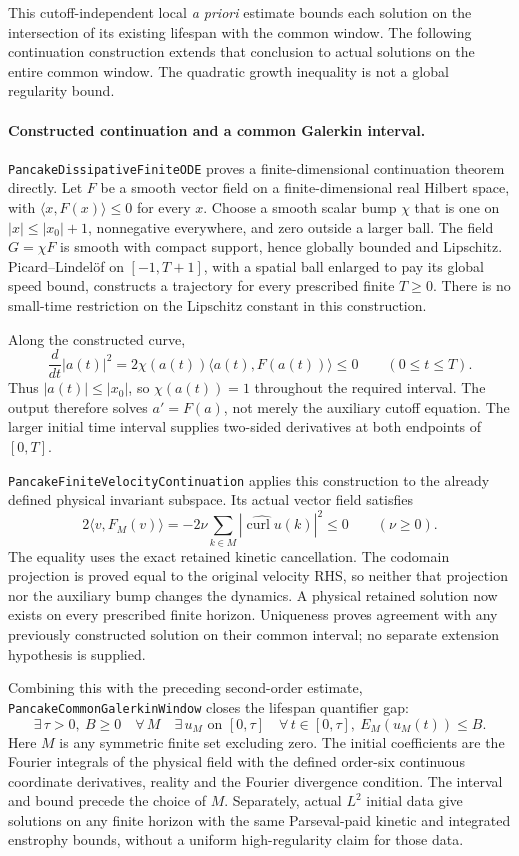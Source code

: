 \documentclass[11pt]{article}
\theoremstyle{definition}
\begin{document}
This cutoff-independent local \emph{a priori} estimate bounds each
solution on the intersection of its existing lifespan with the common
window. The following continuation construction extends that conclusion
to actual solutions on the entire common window. The quadratic growth
inequality is not a global regularity bound.

\paragraph{Constructed continuation and a common Galerkin interval.}
\texttt{PancakeDissipativeFiniteODE} proves a finite-dimensional
continuation theorem directly. Let $F$ be a smooth vector field on a
finite-dimensional real Hilbert space, with
$\langle x,F(x)\rangle\le0$ for every $x$.
Choose a smooth scalar bump $\chi$ that is one on
$|x|\le|x_0|+1$, nonnegative everywhere, and zero outside a larger ball.
The field $G=\chi F$ is smooth with compact support, hence globally
bounded and Lipschitz. Picard--Lindel\"of on $[-1,T+1]$, with a spatial
ball enlarged to pay its global speed bound, constructs a trajectory
for every prescribed finite $T\ge0$. There is no small-time restriction
on the Lipschitz constant in this construction.

Along the constructed curve,
\[
 \frac{d}{dt}|a(t)|^2
   =2\chi(a(t))\langle a(t),F(a(t))\rangle\le0
       \qquad(0\le t\le T).
\]
Thus $|a(t)|\le|x_0|$, so $\chi(a(t))=1$ throughout the required
interval. The output therefore solves $a'=F(a)$, not merely the
auxiliary cutoff equation. The larger initial time interval supplies
two-sided derivatives at both endpoints of $[0,T]$.

\texttt{PancakeFiniteVelocityContinuation} applies this construction
to the already defined physical invariant subspace. Its actual vector
field satisfies
\[
 2\langle v,F_M(v)\rangle
    =-2\nu\sum_{k\in M}|\widehat{\operatorname{curl}u}(k)|^2\le0
       \qquad(\nu\ge0).
\]
The equality uses the exact retained kinetic cancellation. The
codomain projection is proved equal to the original velocity RHS,
so neither that projection nor the auxiliary bump changes the
dynamics. A physical retained solution now exists on every prescribed
finite horizon. Uniqueness proves agreement with any previously
constructed solution on their common interval; no separate extension
hypothesis is supplied.

Combining this with the preceding second-order estimate,
\texttt{PancakeCommonGalerkinWindow} closes the lifespan quantifier gap:
\[
 \boxed{\quad
 \exists\,\tau>0,\ B\ge0\quad
 \forall\,M\quad
 \exists\,u_M\text{ on }[0,\tau]\quad
 \forall\,t\in[0,\tau],\ E_M(u_M(t))\le B .
 \quad}
\]
Here $M$ is any symmetric finite set excluding zero. The initial
coefficients are the Fourier integrals of the physical field with the
defined order-six continuous coordinate derivatives, reality and the
Fourier divergence condition. The interval and bound precede the
choice of $M$. Separately, actual $L^2$ initial data give solutions on
any finite horizon with the same Parseval-paid kinetic and integrated
enstrophy bounds, without a uniform high-regularity claim for those data.
\end{document}
